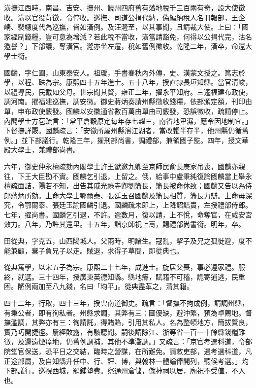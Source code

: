 \begin{pinyinscope}
潢撫江西時，南昌、吉安、撫州、饒州四府舊有落地稅千三百兩有奇，設大使徵收。潢以官役苛徵，令停收。巡撫、司道公捐代納，偽編納稅人名冊報部，王企崝、裴幰度代為巡撫，皆如潢例。及汪漋至，以其事聞，且請裁大使。上曰：「國家經制錢糧，豈可意為增減？若此稅不當收，潢當請豁免，何得以公捐代完，沽名邀譽？」下部議，奪潢官。漋亦坐左遷，稅如舊例徵收。乾隆二年，潢卒，命還大學士銜。

國麟，字仁圃，山東泰安人。祖瑗，手書春秋內外傳，史、漢蒙文授之。篤志於學，以程、硃為宗。康熙四十五年進士。五十八年，授直隸長垣知縣。當官清峻，以禮導民，民戴如父母。世宗聞其賢，雍正二年，擢永平知府。三遷福建布政使，調河南。擢福建巡撫，調安徽。御史蔣炳奏請州縣徵收錢糧，依部頒定額，刊印由單，申布政使覈發。國麟以安徽通省數百萬由單由司覈發，恐誤徵收，疏請停止。內閣學士方苞疏言：「常平倉穀原定每年存七糶三，南省地卑濕，應令因地制宜。」下督撫詳覈。國麟疏言：「安徽所屬州縣濱江湖者，當改糶半存半，他州縣仍循舊例。」並下部議行。乾隆三年，擢刑部尚書，調禮部，兼領國子監。四年，授文華殿大學士，兼禮部尚書。

六年，御史仲永檀疏劾內閣學士許王猷邀九卿至京師民俞長庚家吊喪，國麟亦親往，下王大臣勘不實。國麟乞引退，上留之。俄，給事中盧秉純復論國麟當上舉永檀疏面詰，陽若不知，出告其戚光祿寺卿劉籓長，籓長被命休致；國麟又告以為侍郎蔣炳所劾。上命大學士鄂爾泰、張廷玉召國麟及籓長相質，籓長力辯。上命毋深究，令鄂爾泰、張廷玉諭國麟引退。國麟疏未即上，上降詔詰責，左授禮部侍郎。七年，擢尚書。國麟乞引退，不許。逾數月，復以請，上不悅，命奪官，在咸安宮效力。八年，乃許其還里。十五年，詣京師祝上壽，賜禮部尚書銜。明年，卒。

田從典，字克五，山西陽城人。父雨時，明諸生。寇亂，挈子及兄之孤徙避，度不能兼顧，棄子負兄子以走。賊退，求得子草間，即從典也。

從典篤學，以宋五子為宗。康熙二十七年，成進士。旋居父喪，事必遵家禮。服終，就選。三十四年，授廣東英德知縣。縣地瘠，賦籍不可稽，詭寄逋逃，民重困。陋例兩加至八九錢，名曰「均平」。從典盡革之，清其籍。

四十二年，行取，四十三年，授雲南道御史。疏言：「督撫不拘成例，請調州縣，有秉公者，即有徇私者。州縣求調，其弊有三：圖優缺，避沖繁，預為卓薦地。督撫濫調，其弊亦有三：徇請託，得賄賂，引用其私人。名為整頓地方，簡拔賢良，實乃巧開捷徑。屢經敗露，有駭聽聞。嗣後請除江、浙等省一百一十餘縣錢糧難徵，及邊遠煙瘴地，仍舊例調補，其他不準濫調。」又疏言：「京官考選科道，令部院堂官保送，恐平日之交結，臨時之營謀，在所難免。請敕吏部，遇考選科道，凡正途部屬，及自知縣升任中、行、評、博，與翰林一體論俸開列，聽候考選。」均下部議行。巡視西城，罷鋪墊費。察通州倉儲，僦神祠以居，廟祝不受值，不入也。


\end{pinyinscope}
